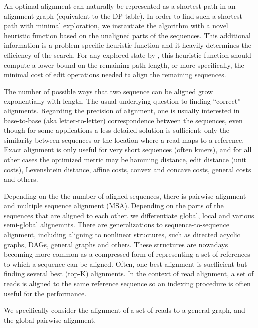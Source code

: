 An optimal alignment can naturally be represented as a shortest path in an
alignment graph (equivalent to the DP table). In order to find such a shortest
path with minimal exploration, we instantiate the \A algorithm with a novel
heuristic function based on the unaligned parts of the sequences. This
additional information is a problem-specific heuristic function and it heavily
determines the efficiency of the search. For any explored state by \A, this
heuristic function should compute a lower bound on the remaining path length, or
more specifically, the minimal cost of edit operations needed to align the
remaining sequences.


The number of possible ways that two sequence can be aligned grow exponentially
with length. The usual underlying question to finding ``correct'' alignments.
Regarding the precision of alignment, one is usually interested in base-to-base
(aka letter-to-letter) correspondence between the sequences, even though for
some applications a less detailed solution is sufficient: only the similarity
between sequences or the location where a read maps to a reference. Exact
alignment is only useful for very short sequences (often kmers), and for all
other cases the optimized metric may be hamming distance, edit distance (unit
costs), Levenshtein distance, affine costs, convex and concave costs, general
costs and others. 

Depending on the the number of aligned sequences, there is pairwise alignment
and multiple sequence alignment (MSA). Depending on the parts of the sequences
that are aligned to each other, we differentiate global, local and various
semi-global alignemnts. There are generalizations to sequence-to-sequence
alignment, including aligning to nonlinear structures, such as directed acyclic
graphs, DAGs, general graphs and others. These structures are nowadays becoming
more common as a compressed form of representing a set of references to which a
sequence can be aligned. Often, one best alignment is suefficient but finding
several best (top-K) alignments. In the context of read alignment, a set of reads
is aligned to the same reference sequence so an indexing procedure is often
useful for the performance.

We specifically consider the alignment of a set of reads to a general graph, and
the global pairwise alignment.


